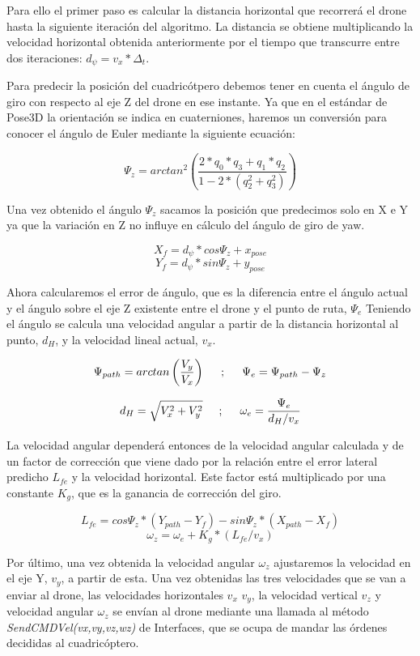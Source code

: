 \hspace{1cm} Para ello el primer paso es calcular la distancia horizontal que recorrerá el drone hasta la siguiente iteración del algoritmo. La distancia se obtiene multiplicando la velocidad horizontal obtenida anteriormente por el tiempo que transcurre entre dos iteraciones: \(d_{\psi} = v_{x} * \Delta_{t}\).

\hspace{1cm} Para predecir la posición del cuadricótpero debemos tener en cuenta el ángulo de giro con respecto al eje Z del drone en ese instante. Ya que en el estándar de Pose3D la orientación se indica en cuaterniones, haremos un conversión para conocer el ángulo de Euler mediante la siguiente ecuación:

\[ \Psi_{z} = arctan^{2}\left( \frac{2*q_{0}*q_{3}+q_{1}*q_{2}}{1-2*(q_{2}^{2}+q_{3}^{2})}\right) \]
 
\hspace{1cm} Una vez obtenido el ángulo $\Psi_{z}$ sacamos la posición que predecimos solo en X e Y ya que la variación en Z no influye en cálculo del ángulo de giro de yaw.

\[ X_{f} = d_{\psi} * cos \Psi_{z} + x_{pose} \] 
\[ Y_{f} = d_{\psi} * sin \Psi_{z} + y_{pose} \]

\hspace{1cm} Ahora calcularemos el error de ángulo, que es la diferencia entre el ángulo actual y el ángulo sobre el eje Z existente entre el drone y el punto de ruta, $\Psi_{e}$ Teniendo el ángulo se calcula una velocidad angular a partir de la distancia horizontal al punto, $d_{H}$, y la velocidad lineal actual, $v_{x}$.
 
\[\Psi_{path} = arctan \left(\frac{V_{y}}{V_{x}}\right)  \hspace{0.5cm};\hspace{0.5cm}\Psi_{e} = \Psi_{path} - \Psi_{z} \]

\[d_{H} = \sqrt{V_{x}^{2} + V_{y}^{2}} \hspace{0.5cm};\hspace{0.5cm} \omega_{e} =  \dfrac{\Psi_{e}}{d_{H}/v_{x}}\]

\hspace{1cm} La velocidad angular dependerá entonces de la velocidad angular calculada y de un factor de corrección que viene dado por la relación entre el error lateral predicho $L_{fe}$ y la velocidad horizontal. Este factor está multiplicado por una constante $K_{g}$, que es la ganancia de corrección del giro.

\[ L_{fe} = cos\Psi_{z}*(Y_{path}-Y_{f}) - sin\Psi_{z}*(X_{path}-X_{f}) \]
\[ \omega_{z} = \omega_{e} + K_{g} * (L_{fe}/v_{x})\]

\hspace{1cm} Por último, una vez obtenida la velocidad angular $\omega_{z}$ ajustaremos la velocidad en el eje Y, $v_{y}$, a partir de esta. Una vez obtenidas las tres velocidades que se van a enviar al drone, las velocidades horizontales $v_{x}$ $v_{y}$, la velocidad vertical $v_{z}$ y velocidad angular $\omega_{z}$ se envían al drone mediante una llamada al método \textit{SendCMDVel(vx,vy,vz,wz)}
de Interfaces, que se ocupa de mandar las órdenes decididas al cuadricóptero.
